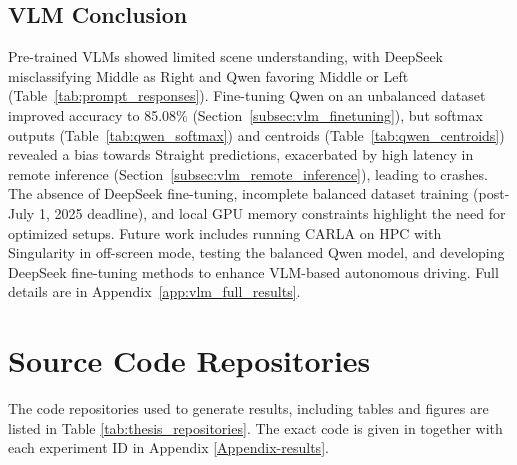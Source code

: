 \subsection{VLM Conclusion}
\label{subsec:vlm_conclusion}
Pre-trained VLMs showed limited scene understanding, with DeepSeek misclassifying Middle as Right and Qwen favoring Middle or Left (Table~\ref{tab:prompt_responses}). Fine-tuning Qwen on an unbalanced dataset improved accuracy to 85.08\% (Section~\ref{subsec:vlm_finetuning}), but softmax outputs (Table~\ref{tab:qwen_softmax}) and centroids (Table~\ref{tab:qwen_centroids}) revealed a bias towards Straight predictions, exacerbated by high latency in remote inference (Section~\ref{subsec:vlm_remote_inference}), leading to crashes. The absence of DeepSeek fine-tuning, incomplete balanced dataset training (post-July 1, 2025 deadline), and local GPU memory constraints highlight the need for optimized setups. Future work includes running CARLA on HPC with Singularity in off-screen mode, testing the balanced Qwen model, and developing DeepSeek fine-tuning methods to enhance VLM-based autonomous driving. Full details are in Appendix~\ref{app:vlm_full_results}.



\section{Source Code Repositories}
The code repositories used to generate results, including tables and figures are listed in Table \ref{tab:thesis_repositories}.
The exact code is given in together with each experiment ID in Appendix \ref{Appendix-results}.

